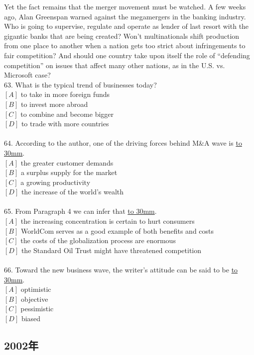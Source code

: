 \documentclass[a4paper]{article}
\begin{document}
\par
Yet the fact remains that the merger movement must be watched. A few weeks ago, Alan Greenspan warned against the megamergers in the banking industry. Who is going to supervise, regulate and operate as lender of last resort with the gigantic banks that are being created? Won’t multinationals shift production from one place to another when a nation gets too strict about infringements to fair competition? And should one country take upon itself the role of “defending competition” on issues that affect many other nations, as in the U.S. vs. Microsoft case?
\\63.	What is the typical trend of businesses today?\\$[A]$ to take in more foreign funds\\$[B]$ to invest more abroad\\$[C]$ to combine and become bigger\\$[D]$ to trade with more countries\\\\64.	According to the author, one of the driving forces behind M\&A wave is \underline{\hbox to 30mm{}}.\\$[A]$ the greater customer demands\\$[B]$ a surplus supply for the market\\$[C]$ a growing productivity\\$[D]$ the increase of the world’s wealth\\\\65.	From Paragraph 4 we can infer that \underline{\hbox to 30mm{}}.\\$[A]$ the increasing concentration is certain to hurt consumers\\$[B]$ WorldCom serves as a good example of both benefits and costs\\$[C]$ the costs of the globalization process are enormous\\$[D]$ the Standard Oil Trust might have threatened competition\\\\66.	Toward the new business wave, the writer’s attitude can be said to be \underline{\hbox to 30mm{}}.\\$[A]$ optimistic\\$[B]$ objective\\$[C]$ pessimistic\\$[D]$ biased\\\subsection{2002年}
\end{document}
